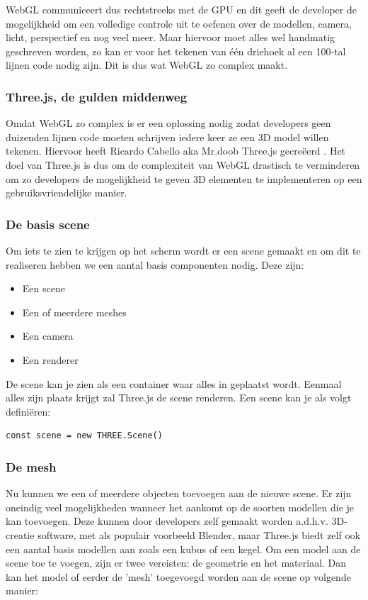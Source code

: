WebGL communiceert dus rechtstreeks met de GPU en dit geeft de developer de mogelijkheid om een volledige controle uit te oefenen over de modellen, camera, licht, perspectief en nog veel meer. Maar hiervoor moet alles wel handmatig geschreven worden, zo kan er voor het tekenen van één driehoek al een 100-tal lijnen code nodig zijn. Dit is dus wat WebGL zo complex maakt.

\subsubsection{Three.js, de gulden middenweg}

Omdat WebGL zo complex is er een oplossing nodig zodat developers geen duizenden lijnen code moeten schrijven iedere keer ze een 3D model willen tekenen. Hiervoor heeft Ricardo Cabello aka Mr.doob Three.js gecreëerd \autocite{Danchilla2012}. Het doel van Three.js is dus om de complexiteit van WebGL drastisch te verminderen om zo developers de mogelijkheid te geven 3D elementen te implementeren op een gebruiksvriendelijke manier.

\subsubsection{De basis scene}

Om iets te zien te krijgen op het scherm wordt er een scene gemaakt en om dit te realiseren hebben we een aantal basis componenten nodig. Deze zijn:  

\begin{itemize}
	\item Een scene
	\item Een of meerdere meshes
	\item Een camera
	\item Een renderer
\end{itemize}

De scene kan je zien als een container waar alles in geplaatst wordt. Eenmaal alles zijn plaats krijgt zal Three.js de scene renderen. Een scene kan je als volgt definiëren: 

\begin{lstlisting}
const scene = new THREE.Scene()
\end{lstlisting}

\subsubsection{De mesh}

Nu kunnen we een of meerdere objecten toevoegen aan de nieuwe scene. Er zijn oneindig veel mogelijkheden wanneer het aankomt op de soorten modellen die je kan toevoegen. Deze kunnen door developers zelf gemaakt worden a.d.h.v. 3D-creatie software, met als populair voorbeeld Blender, maar Three.js biedt zelf ook een aantal basis modellen aan zoals een kubus of een kegel.
Om een model aan de scene toe te voegen, zijn er twee vereisten: de geometrie en het materiaal. Dan kan het model of eerder de 'mesh' toegevoegd worden aan de scene op volgende manier:


